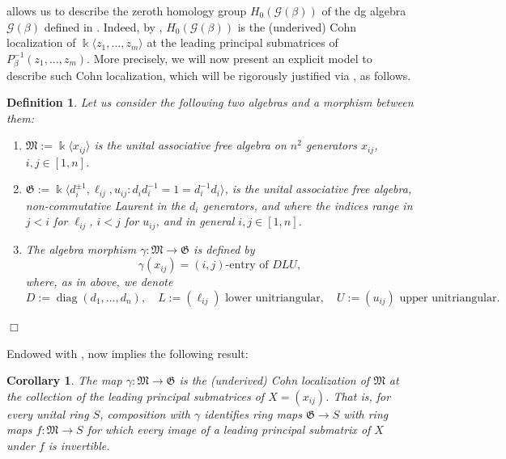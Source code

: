\documentclass[11pt]{article}
\newtheorem{corollary}[theorem]{Corollary}
\newtheorem{definition}[theorem]{Definition}
\newcommand{\kk}{\Bbbk}
\newcommand{\FM}{\mathfrak M}
\newcommand{\FG}{\mathfrak G}
\newcommand{\lr}{\longrightarrow}
\newcommand{\diag}{\operatorname{diag}}
\newcommand{\cG}{\mathcal G}
\begin{document}
 allows us to describe the zeroth homology group $H_0(\cG(\beta))$ of the dg algebra $\cG(\beta)$ defined in . Indeed, by , $H_0(\cG(\beta))$ is the (underived) Cohn localization of $\kk\langle z_1,\ldots,z_m\rangle$ at the leading principal submatrices of $P_\beta^{-1}(z_1,\ldots,z_m)$. More precisely, we will now present an explicit model to describe such Cohn localization, which will be rigorously justified via , as follows.

\begin{definition}\label{def:FM_and_FG} Let us consider the following two algebras and a morphism between them:

\begin{enumerate}[label=$(\roman*)$]
    \item $\FM:=\kk\langle x_{ij}\rangle$ is the unital associative free algebra on $n^2$ generators $x_{ij}$, $i,j\in[1,n]$.

    \item  $\FG:=
 \kk\langle d_i^{\pm1},\ell_{ij},u_{ij}: d_id_i^{-1}=1=d_i^{-1}d_i\rangle$, is the unital associative free algebra, non-commutative Laurent in the $d_i$ generators, and where the indices range in $j<i$ for $\ell_{ij}$, $i<j$ for $u_{ij}$, and in general $i,j\in[1,n]$.

 \item The algebra morphism $\gamma:\FM\lr\FG$ is defined by
 $$\gamma(x_{ij})=(i,j)\mbox{-entry of }DLU,$$
 where, as in  above, we denote
 $$ D:=\diag(d_1,\ldots,d_n),\quad
 L:=(\ell_{ij})\text{ lower unitriangular},\quad
 U:=(u_{ij})\text{ upper unitriangular}.$$
\end{enumerate}
\hfill$\Box$
\end{definition}

Endowed with ,  now implies the following result:

\begin{corollary}
\label{cor:gamma-localization}
The map \(\gamma:\FM\lr\FG\) is the (underived) Cohn localization of
\(\FM\) at the collection of the leading principal submatrices of $X=(x_{ij})$. That is, for every unital ring \(S\), composition with \(\gamma\)
identifies ring maps \(\FG\to S\) with ring maps \(f:\FM\to S\)
for which every image of a leading principal submatrix of $X$ under \(f\) is invertible.
\end{corollary}
\end{document}
